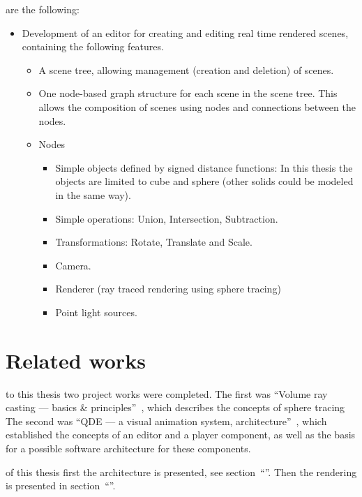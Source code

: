 \documentclass[%
    a4paper,    %
    justified,  %
    nobib,      %
    openany     %
]{tufte-book}
\begin{document}
 are the following:
\begin{itemize}
  \item Development of an editor for creating and editing real time rendered
    scenes, containing the following features.
    \begin{itemize}
      \item A scene tree, allowing management (creation and deletion) of
        scenes.
      \item One node-based graph structure for each scene in the scene tree.
        This allows the composition of scenes using
        nodes and connections between the nodes.
    \item Nodes
      \begin{itemize}
        \item Simple objects defined by signed distance functions: In this
          thesis the objects are limited to cube and sphere (other solids could
          be modeled in the same way).
        \item Simple operations: Union, Intersection, Subtraction.
        \item Transformations: Rotate, Translate and Scale.
        \item Camera.
        \item Renderer (ray traced rendering using sphere tracing)
        \item Point light sources.
      \end{itemize}
    \end{itemize}
\end{itemize}

\section{Related works}
\label{sec:related-works}

 to this thesis two project works were completed.
The first was \enquote{Volume ray casting --- basics \&
principles}~\cite{osterwalder-volume-2016}, which describes the concepts
of sphere tracing The second was \enquote{QDE
--- a visual animation system, architecture}~\cite{osterwalder-qde-2016}, which
established the concepts of an editor and a player component, as well as
the basis for a possible software architecture for these components.

 of this thesis first the
architecture is presented, see section~\enquote{}. Then the rendering is
presented in section~\enquote{}.
\end{document}
